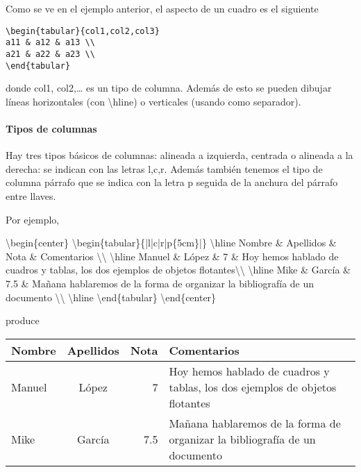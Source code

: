 \documentclass[11pt]{article}
\newenvironment{Shaded}{}{}
\newcommand{\NormalTok}[1]{{#1}}
\begin{document}
Como se ve en el ejemplo anterior, el aspecto de un cuadro es el
siguiente
\begin{verbatim}
\begin{tabular}{col1,col2,col3}
a11 & a12 & a13 \\
a21 & a22 & a23 \\
\end{tabular}
\end{verbatim}

donde col1, col2,\ldots{} es un tipo de columna. Además de esto se
pueden dibujar líneas horizontales (con \textbackslash{}hline) o verticales (usando \textbar{} como separador).

\paragraph{Tipos de columnas}

Hay tres tipos básicos de columnas: alineada a izquierda, centrada o
alineada a la derecha: se indican con las letras l,c,r. Además también
tenemos el tipo de columna párrafo que se indica con la letra p seguida
de la anchura del párrafo entre llaves.

Por ejemplo,
\begin{Shaded}
\begin{Highlighting}[]
\NormalTok{\textbackslash{}begin\{center\}}
\NormalTok{\textbackslash{}begin\{tabular\}\{|l|c|r|p\{5cm\}|\}}
\NormalTok{\textbackslash{}hline Nombre & Apellidos & Nota & Comentarios \textbackslash{}\textbackslash{}}
\NormalTok{\textbackslash{}hline Manuel & López & 7 & Hoy hemos hablado 
de cuadros y tablas, los dos ejemplos de objetos flotantes\textbackslash{}\textbackslash{}}
\NormalTok{\textbackslash{}hline Mike  & García & 7.5 & Mañana
hablaremos de la forma de organizar la bibliografía de un documento \textbackslash{}\textbackslash{}}
\NormalTok{\textbackslash{}hline}
\NormalTok{\textbackslash{}end\{tabular\}}
\NormalTok{\textbackslash{}end\{center\}}
\end{Highlighting}
\end{Shaded}
produce
\begin{center}
\begin{tabular}{|l|c|r|p{5cm}|}
\hline Nombre & Apellidos & Nota & Comentarios \\
\hline Manuel & López & 7 & Hoy hemos hablado de cuadros y tablas, los dos ejemplos de objetos flotantes\\
\hline Mike  & García & 7.5 & Mañana hablaremos de la forma de organizar la bibliografía de un documento \\
\hline
\end{tabular}
\end{center}
\end{document}
